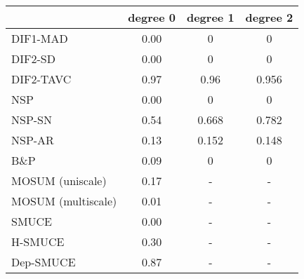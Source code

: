 \begin{tabular}{|l|c|c|c|}
  \hline
 & degree 0 & degree 1 & degree 2 \\ 
  \hline
DIF1-MAD & 0.00 & 0 & 0 \\ 
  DIF2-SD & 0.00 & 0 & 0 \\ 
  DIF2-TAVC & 0.97 & 0.96 & 0.956 \\ 
  NSP & 0.00 & 0 & 0 \\ 
  NSP-SN & 0.54 & 0.668 & 0.782 \\ 
  NSP-AR & 0.13 & 0.152 & 0.148 \\ 
  B\&P & 0.09 & 0 & 0 \\ 
  MOSUM (uniscale) & 0.17 & - & - \\ 
  MOSUM (multiscale) & 0.01 & - & - \\ 
  SMUCE & 0.00 & - & - \\ 
  H-SMUCE & 0.30 & - & - \\ 
  Dep-SMUCE & 0.87 & - & - \\ 
   \hline
\end{tabular}
